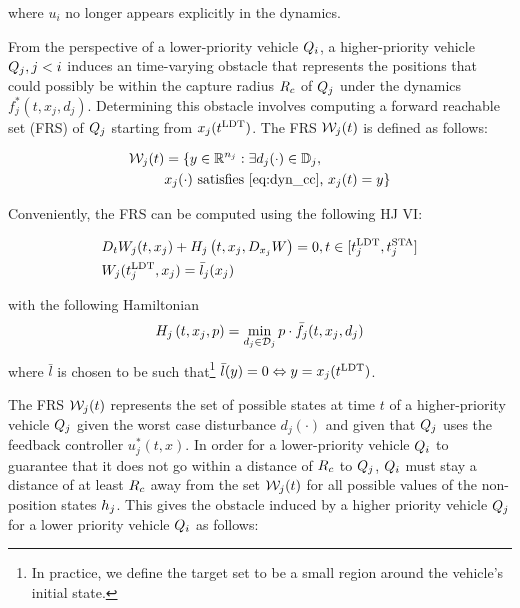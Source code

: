 \noindent where $u_i$ no longer appears explicitly in the dynamics.

From the perspective of a lower-priority vehicle $Q_i$, a higher-priority vehicle $Q_j, j < i$ induces an time-varying obstacle that represents the positions that could possibly be within the capture radius $R_c$ of $Q_j$ under the dynamics $f^*_j(t, x_j, d_j)$. Determining this obstacle involves computing a forward reachable set (FRS) of $Q_j$ starting from $x_j(t^\text{LDT})$. The FRS $\mathcal{W}_j(t)$ is defined as follows:

\begin{equation}
\label{eq:FRS1}
\begin{aligned}
\mathcal{W}_j(t) &= \{y \in \mathbb{R}^{n_j}: \exists d_j(\cdot) \in \mathbb{D}_j, \\
&x_j(\cdot) \text{ satisfies \eqref{eq:dyn_cc}, }x_j(t) = y\}
\end{aligned}
\end{equation}

Conveniently, the FRS can be computed using the following HJ VI:

\begin{equation}
\label{eq:FRS_HJIVI}
\begin{aligned}
&D_t W_j(t, x_j) + H_j\left(t, x_j, D_{x_j} W\right) = 0, t \in [t^\text{LDT}_j, t^\text{STA}_j]\\
&W_j(t^\text{LDT}_j, x_j) = \bar l_j(x_j) \\
\end{aligned}
\end{equation}

\noindent with the following Hamiltonian
\begin{equation}
H_j\left(t, x_j, p\right) = \min_{d_j \in \mathcal{D}_j} p \cdot \bar f_j(t, x_j, d_j)
\end{equation}
\noindent where $\bar l$ is chosen to be such that\footnote{In practice, we define the target set to be a small region around the vehicle's initial state.} $\bar l (y) = 0 \Leftrightarrow y = x_j(t^\text{LDT})$.

The FRS $\mathcal{W}_j(t)$ represents the set of possible states at time $t$ of a higher-priority vehicle $Q_j$ given the worst case disturbance $d_j(\cdot)$ and given that $Q_j$ uses the feedback controller $u_j^*(t, x)$. In order for a lower-priority vehicle $Q_i$ to guarantee that it does not go within a distance of $R_c$ to $Q_j$, $Q_i$ must stay a distance of at least $R_c$ away from the set $\mathcal{W}_j(t)$ for all possible values of the non-position states $h_j$. This gives the obstacle induced by a higher priority vehicle $Q_j$ for a lower priority vehicle $Q_i$ as follows:

